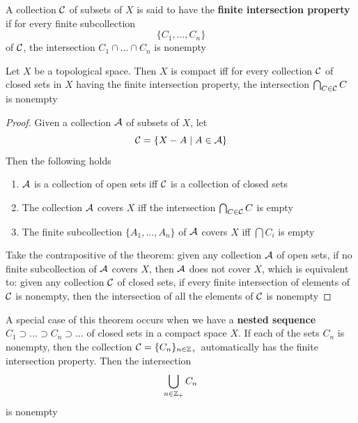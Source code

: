 \documentclass[11pt]{article}
\begin{document}
\begin{definition}[]
A collection \(\mathcal{C}\)  of subsets of \(X\) is said to have the \textbf{finite intersection property} if for
every finite subcollection
\begin{equation*}
\{C_1,\dots,C_n\}
\end{equation*}
of \(\mathcal{C}\), the intersection \(C_1\cap\dots\cap C_n\) is nonempty
\end{definition}

\begin{theorem}[]
\label{thm26.9}
Let \(X\) be a topological space. Then \(X\) is compact iff for every collection \(\mathcal{C}\) of closed
sets in \(X\) having the finite intersection property, the intersection \(\bigcap_{C\in\mathcal{C}}C\) is nonempty
\end{theorem}

\begin{proof}
Given a collection \(\mathcal{A}\) of subsets of \(X\), let
\begin{equation*}
\mathcal{C}=\{X-A\mid A\in\mathcal{A}\}
\end{equation*}
Then the following holds
\begin{enumerate}
\item \(\mathcal{A}\) is a collection of open sets iff \(\mathcal{C}\) is a collection of closed sets
\item The collection \(\mathcal{A}\) covers \(X\) iff the intersection \(\bigcap_{C\in\mathcal{C}}C\) is empty
\item The finite subcollection \(\{A_1,\dots,A_n\}\) of \(\mathcal{A}\) covers \(X\) iff \(\bigcap C_i\) is empty
\end{enumerate}


Take the contrapositive of the theorem: given any collection \(\mathcal{A}\) of open sets, if no finite
subcollection of \(\mathcal{A}\) covers \(X\), then \(\mathcal{A}\) does not cover \(X\), which is equivalent to:
given any collection \(\mathcal{C}\) of closed sets, if every finite intersection of elements of \(\mathcal{C}\) is
nonempty, then the intersection of all the elements of \(\mathcal{C}\) is nonempty
\end{proof}

A special case of this theorem occurs when we have a \textbf{nested sequence} \(C_1\supset\dots\supset C_n\supset\dots\) of closed
sets in a compact space \(X\). If each of the sets \(C_n\) is nonempty, then the
collection \(\mathcal{C}=\{C_n\}_{n\in\mathbb{Z}_+}\) automatically has the finite intersection property. Then the
intersection
\begin{equation*}
\bigcup_{n\in\mathbb{Z}_+}C_n
\end{equation*}
is nonempty
\end{document}
